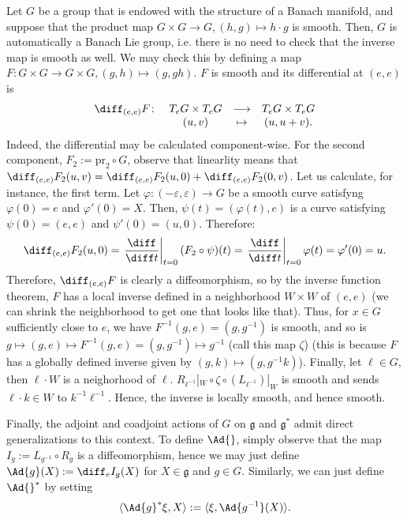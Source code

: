  \begin{obs}
    Let \(G\) be a group that is endowed with the structure of a Banach manifold, and suppose that the product map \(G \times G \to G, (h,g) \mapsto h \cdot g\) is smooth. Then, \(G\) is automatically a Banach Lie group, i.e. there is no need to check that the inverse map is smooth as well. We may check this by defining a map \(F\colon G \times G \to G \times G, (g,h) \mapsto (g, gh)\). \(F\) is smooth and its differential at \((e,e)\) is 
    \[
    \begin{array}{cccc}
    \diff_{(e,e)}F \colon & T_e G \times T_eG & \longrightarrow & T_eG \times T_eG\\
    & (u,v) & \mapsto & (u, u+v).     
    \end{array}
    \]
    Indeed, the differential may be calculated component-wise. For the second component, \(F_2:=\mathrm{pr}_2 \circ G\), observe that linearlity means that \(\diff_{(e,e)}F_2(u,v)=\diff_{(e,e)}F_2(u,0) + \diff_{(e,e)}F_2(0,v)\). Let us calculate, for instance, the first term. Let \(\varphi\colon (-\varepsilon, \varepsilon) \to G\) be a smooth curve satisfyng \(\varphi(0)=e\) and \(\varphi'(0)=X\). Then, \(\psi(t)=(\varphi(t), e)\) is a curve satisfying \(\psi(0)=(e,e)\) and \(\psi'(0)=(u,0)\). Therefore:
    \[
    \diff_{(e,e)}F_2(u,0)=\left.\frac{\diff}{\diff t}\right|_{t=0} (F_2 \circ \psi)(t) = \left.\frac{\diff}{\diff t}\right|_{t=0} \varphi(t)=\varphi'(0)=u.    \]
    Therefore, \(\diff_{(e,e)}F\) is clearly a diffeomorphism, so by the inverse function theorem, \(F\) has a local inverse defined in a neighborhood \(W\times W\) of \((e,e)\) (we can shrink the neighborhood to get one that looks like that). Thus, for \(x \in G\) sufficiently close to \(e\), we have \(F^{-1}(g,e)=(g,g^{-1})\) is smooth, and so is \(g \mapsto (g,e) \mapsto F^{-1}(g,e)=(g,g^{-1}) \mapsto g^{-1}\) (call this map \(\zeta\)) (this is because \(F\) has a globally defined inverse given by \((g,k) \mapsto (g,g^{-1}k)\)). Finally, let \(\ell \in G\), then \(\ell\cdot W\) is a neighorhood of \(\ell\). \(R_{\ell^{-1}} |_W\circ \zeta \circ (L_{\ell^{-1}})|_W\) is smooth and sends \(\ell \cdot k \in W\) to \(k^{-1}\ell^{-1}\). Hence, the inverse is locally smooth, and hence smooth. \label{Lie_group_inverse_superfluous}
 \end{obs}

Finally, the adjoint and coadjoint actions of \(G\) on \(\mathfrak{g}\) and \(\mathfrak{g}^*\) admit direct generalizations to this context. To define \(\Ad{}\), simply observe that the map \(I_g:=L_{g^{-1}} \circ R_g\) is a diffeomorphism, hence we may just define \(\Ad{g}(X):=\diff_e I_g(X)\) for \(X \in \mathfrak{g}\) and \(g \in G\). Similarly, we can just define \(\Ad{}^*\) by setting 
\[
\langle \Ad{g}^* \xi, X\rangle :=\langle \xi, \Ad{g^{-1}}(X) \rangle.
\]

